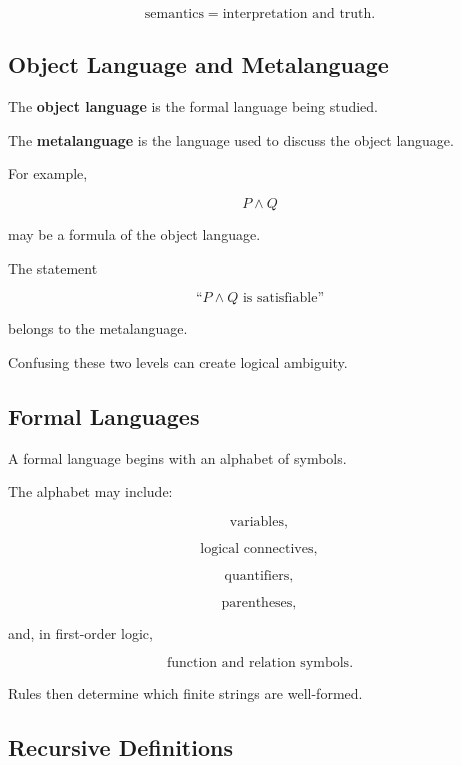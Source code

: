 \[
\boxed{
\text{semantics}
=
\text{interpretation and truth}.
}
\]

\subsection{Object Language and Metalanguage}
\label{subsec:object-language-metalanguage}

The \textbf{object language} is the formal language being studied.

The \textbf{metalanguage} is the language used to discuss the object
language.

For example,

\[
P\land Q
\]

may be a formula of the object language.

The statement

\[
\boxed{
\text{``\(P\land Q\) is satisfiable''}
}
\]

belongs to the metalanguage.

Confusing these two levels can create logical ambiguity.

\subsection{Formal Languages}
\label{subsec:formal-languages}

A formal language begins with an alphabet of symbols.

The alphabet may include:

\[
\boxed{
\text{variables},
}
\]

\[
\boxed{
\text{logical connectives},
}
\]

\[
\boxed{
\text{quantifiers},
}
\]

\[
\boxed{
\text{parentheses},
}
\]

and, in first-order logic,

\[
\boxed{
\text{function and relation symbols}.
}
\]

Rules then determine which finite strings are well-formed.

\subsection{Recursive Definitions}
\label{subsec:formal-recursive-definitions}

